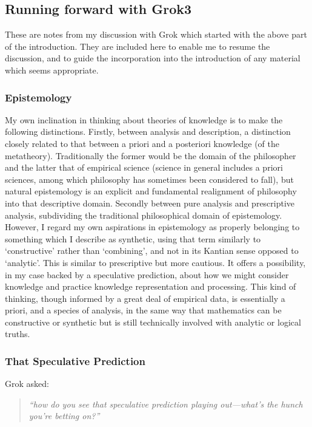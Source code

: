 \subsection{Running forward with Grok3}

These are notes from my discussion with Grok which started with the above part of the introduction.
They are included here to enable me to resume the discussion, and to guide the incorporation into the introduction of any material which seems appropriate.

\subsubsection{Epistemology}

My own inclination in thinking about theories of knowledge is to make the following distinctions.   Firstly, between analysis and description, a distinction closely related to that between a priori and a posteriori knowledge (of the metatheory).  Traditionally the former would be the domain of the philosopher and the latter that of empirical science (science in general includes a priori sciences, among which philosophy has sometimes been considered to fall), but natural epistemology is an explicit and fundamental realignment of philosophy into that descriptive domain.  Secondly between pure analysis and prescriptive analysis, subdividing the traditional philosophical domain of epistemology.  However, I regard my own aspirations in epistemology as properly belonging to something which I describe as synthetic, using that term similarly to `constructive' rather than `combining', and not in its Kantian sense opposed to `analytic'.  This is similar to prescriptive but more cautious.  It offers a possibility, in my case backed by a speculative prediction, about how we might consider knowledge and practice knowledge representation and processing.  This kind of thinking, though informed by a great deal of empirical data, is essentially a priori, and a species of analysis, in the same way that mathematics can be constructive or synthetic but is still technically involved with analytic or logical truths.

\subsubsection{That Speculative Prediction}

Grok asked:
\begin{quote}
  {\it``how do you see that speculative prediction playing out—what’s the hunch you’re betting on?''}
\end{quote}

